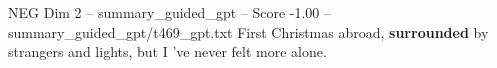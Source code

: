 \begin{textsample}{NEG Dim 2 – summary\_guided\_gpt – Score -1.00 – summary\_guided\_gpt/t469\_gpt.txt}  \label{ex:f2_neg_033}
First Christmas abroad, \textbf{surrounded} by strangers and lights, but I ’ve never felt more alone.

\end{textsample}
